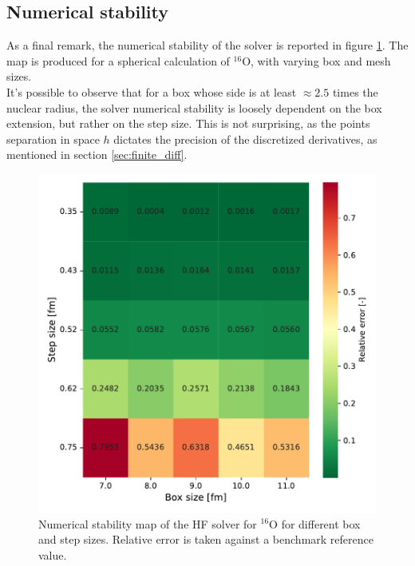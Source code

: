 \subsection{Numerical stability}
As a final remark, the numerical stability of the solver is reported in figure \ref{fig:stability}. The map is produced for a spherical calculation of $^{16}$O, with varying box and mesh sizes. 
\\It's possible to observe that for a box whose side is at least $\approx 2.5$ times the nuclear radius, the solver numerical stability is loosely dependent on the box extension, but rather on the step size. This is not surprising, as the points separation in space $h$ dictates the precision of the discretized derivatives, as mentioned in section \ref{sec:finite_diff}.
\begin{figure}[H]
    \centering
    \includegraphics[width=1.0\textwidth]{Images/stability.pdf}
    \caption{Numerical stability map of the HF solver for $^{16}$O for different box and step sizes. Relative error is taken against a benchmark reference value.}
    \label{fig:stability}
\end{figure}
